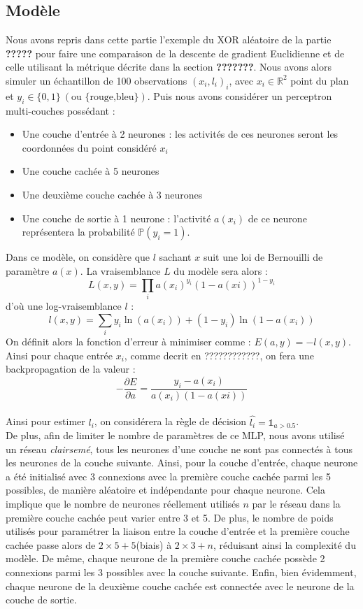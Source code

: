 \documentclass{article}
\theoremstyle{definition}
\begin{document}
\subsection{Modèle}

Nous avons repris dans cette partie l'exemple du XOR aléatoire de la partie \textbf{?????} pour faire une comparaison de la descente de gradient Euclidienne et de celle utilisant la métrique décrite dans la section \textbf{???????}. Nous avons alors simuler un échantillon de 100 observations $(x_i,l_i)_i$, avec $x_i \in \mathbb{R}^2$ point du plan et $y_i\in\{0,1\}\ (\textrm{ou \{rouge,bleu\}})$. Puis nous avons considérer un perceptron multi-couches possédant :
\begin{itemize}
\item Une couche d'entrée à 2 neurones : les activités de ces neurones seront les coordonnées du point considéré $x_i$
\item Une couche cachée à 5 neurones
\item Une deuxième couche cachée à 3 neurones
\item Une couche de sortie à 1 neurone : l'activité $a(x_i)$ de ce neurone représentera la probabilité $\mathbb{P}(y_i=1)$.\\
\end{itemize}

Dans ce modèle, on considère que $l$ sachant $x$ suit une loi de Bernouilli de paramètre $a(x)$. La vraisemblance $L$ du modèle sera alors :
$$L(x,y)=\prod_i{a(x_i)^{y_i}(1-a(xi))^{1-y_i}}$$
d'où une log-vraisemblance $l$ :
$$l(x,y)=\sum_i{y_i\ln(a(x_i))+(1-y_i)\ln(1-a(x_i))}$$
On définit alors la fonction d'erreur à minimiser comme : $E(a,y)=-l(x,y)$.
Ainsi pour chaque entrée $x_i$, comme decrit en ????????????, on fera une backpropagation de la valeur :
$$-\frac{\partial E}{\partial a}=\frac{y_i-a(x_i)}{a(x_i)(1-a(xi))}$$\\


Ainsi pour estimer $l_i$, on considérera la règle de décision $\hat{l_i}=\mathds{1}_{a>0.5}$.\\

De plus, afin de limiter le nombre de paramètres de ce MLP, nous avons utilisé un réseau \textit{clairsemé}, tous les neurones d'une couche ne sont pas connectés à tous les neurones de la couche suivante. Ainsi, pour la couche d'entrée, chaque neurone a été initialisé avec 3 connexions avec la première couche cachée parmi les 5 possibles, de manière aléatoire et indépendante pour chaque neurone. Cela implique que le nombre de neurones réellement utilisés $n$ par le réseau dans la première couche cachée peut varier entre 3 et 5. De plus, le nombre de poids utilisés pour paramétrer la liaison entre la couche d'entrée et la première couche cachée passe alors de $2\times 5 + 5$(biais) à $2\times 3 + n$, réduisant ainsi la complexité du modèle.
De même, chaque neurone de la première couche cachée possède 2 connexions parmi les 3 possibles avec la couche suivante. Enfin, bien évidemment, chaque neurone de la deuxième couche cachée est connectée avec le neurone de la couche de sortie.\\
\end{document}
